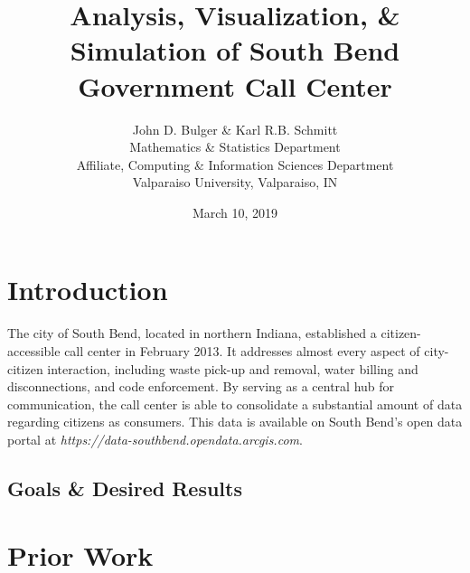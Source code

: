 \documentclass[12pt]{article}
\title{Analysis, Visualization, \& Simulation of South Bend Government Call Center}
\author{John D. Bulger \& Karl R.B. Schmitt\\
	Mathematics \& Statistics Department\\
	Affiliate, Computing \& Information Sciences Department
	\\Valparaiso University, Valparaiso, IN}
\date{March 10, 2019}
\begin{document}
\maketitle
\section{Introduction}
The city of South Bend, located in northern Indiana, established a citizen-accessible call center in February 2013.  It addresses almost every aspect of city-citizen interaction, including waste pick-up and removal, water billing and disconnections, and code enforcement.  By serving as a central hub for communication, the call center is able to consolidate a substantial amount of data regarding citizens as consumers.  This data is available on South Bend's open data portal at \textit{https://data-southbend.opendata.arcgis.com}.

\subsection{Goals \& Desired Results}


\section{Prior Work}
	
\end{document}
